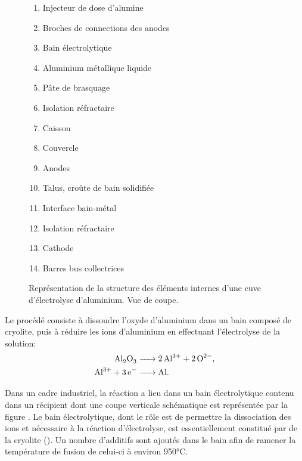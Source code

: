 
\begin{figure}[t]
\begin{center}
  
  \begin{multicols}{2}
    \small
    \begin{enumerate}[label=(\alph*)]
    \item Injecteur de dose d'alumine
    \item Broches de connections des anodes
    \item Bain électrolytique
    \item Aluminium métallique liquide
    \item Pâte de brasquage
    \item Isolation réfractaire
    \item Caisson
    \item Couvercle
    \item Anodes
    \item Talus, croûte de bain solidifiée
    \item Interface bain-métal
    \item Isolation réfractaire
    \item Cathode
    \item Barres bus collectrices
    \end{enumerate}
  \end{multicols}
  \caption{Représentation de la structure des éléments internes
    d'une cuve d'électrolyse d'aluminium. Vue de coupe.}
  \label{fig:electrolysis-pot}
\end{center}
\end{figure}

Le procédé consiste à dissoudre l'oxyde d'aluminium dans un bain
composé de cryolite, puis à réduire les ions d'aluminium en effectuant
l'électrolyse de la solution:
\begin{align}
  \cee{Al2O3 &-> 2Al^{3+} + 2O^{2-}},\label{reac:dissociation}\\
  \cee{Al^{3+} + 3e^{-} &-> Al}.\label{reac:electrolysis}
\end{align}

Dans un cadre industriel, la réaction a lieu dans un bain
électrolytique contenu dans un récipient dont une coupe verticale
schématique est représentée par la figure . Le
bain électrolytique, dont le rôle est de permettre la dissociation des
ions  et  nécessaire à la réaction
d'électrolyse, est essentiellement constitué par de la cryolite
(). Un nombre d'additifs sont ajoutés dans le bain afin
de ramener la température de fusion de celui-ci à environ
\num{950}\si\celsius.

